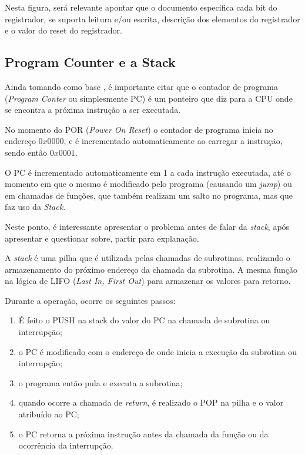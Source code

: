 \documentclass[12pt,a4paper]{report}
\begin{document}
Nesta figura, será relevante apontar que o documento especifica cada bit do registrador, se suporta leitura e/ou escrita, descrição dos elementos do registrador e o valor do reset do registrador.

\subsection{Program Counter e a Stack}

Ainda tomando como base \cite{ci:beginner_guide}, é importante citar que o contador de programa (\textit{Program Conter} ou simplesmente PC) é um ponteiro que diz para a CPU onde se encontra a próxima instrução a ser executada.

No momento do POR (\textit{Power On Reset}) o contador de programa inicia no endereço $0x0000$, e é incrementado automaticamente ao carregar a instrução, sendo então $0x0001$.

O PC é incrementado automaticamente em 1 a cada instrução executada, até o momento em que o mesmo é modificado pelo programa (causando um \textit{jump}) ou em chamadas de funções, que também realizam um salto no programa, mas que faz uso da \textit{Stack}.

Neste ponto, é interessante apresentar o problema antes de falar da \textit{stack}, após apresentar e questionar sobre, partir para explanação.

A \textit{stack} é uma pilha que é utilizada pelas chamadas de subrotinas, realizando o armazenamento do próximo endereço da chamada da subrotina. A mesma função na lógica de LIFO (\textit{Last In, First Out}) para armazenar os valores para retorno.

Durante a operação, ocorre os seguintes passos:

\begin{enumerate}
    \item É feito o PUSH na stack do valor do PC na chamada de subrotina ou interrupção;
    \item o PC é modificado com o endereço de onde inicia a execução da subrotina ou interrupção;
    \item o programa então pula e executa a subrotina;
    \item quando ocorre a chamada de \textit{return}, é realizado o POP na pilha e o valor atribuído ao PC;
    \item o PC retorna a próxima instrução antes da chamada da função ou da ocorrência da interrupção.
\end{enumerate}
\end{document}
